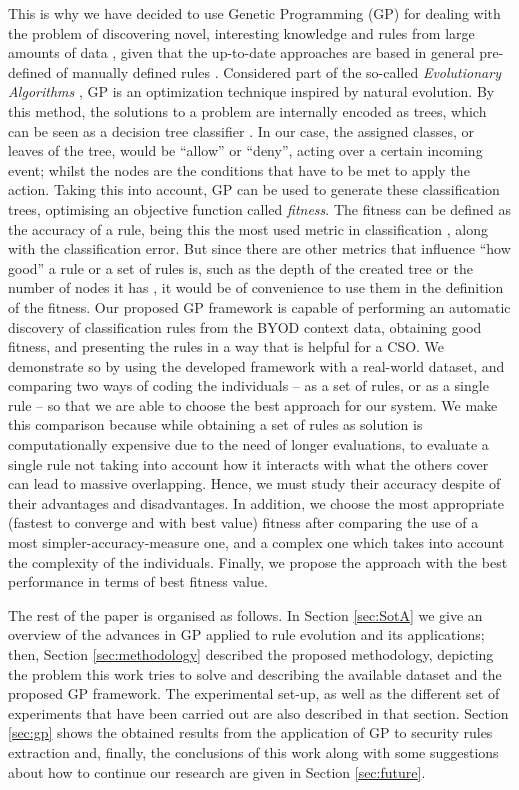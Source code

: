 \documentclass[a4paper,10pt,twocolumn,preprint,3p]{elsarticle}
\begin{document}
This is why we have decided to use Genetic Programming (GP) for dealing with the problem of
discovering novel, interesting knowledge and rules from large
amounts of data \cite{freitas2002data}, given that the up-to-date approaches are based in general pre-defined of manually defined rules \cite{ali2015analysis}. Considered part of the so-called \emph{Evolutionary
  Algorithms} \cite{back1996evolutionary}, GP is an optimization
technique inspired by natural evolution. By this method, the
solutions to a problem are internally encoded as trees, which can be
seen as a decision tree classifier \cite{safavian1990survey}. In our
case, the assigned classes, or leaves of the tree, would be ``allow''
or ``deny'', acting over a certain incoming event; whilst the nodes
are the conditions that have to be met to apply the action. Taking
this into account, GP can be used to generate these classification
trees, optimising an objective function called {\em fitness}. The
fitness can be defined as the accuracy of a rule, being this the most
used metric in classification \cite{witten2005data}, along with the
classification error. But since there are other metrics that influence
``how good'' a rule or a set of rules is, such as the depth of the
created tree or the number of nodes it has
\cite{back1996evolutionary}, it would be of convenience to use them in
the definition of the fitness. 
Our proposed GP framework is capable of performing an automatic discovery
of classification rules from the BYOD context data, obtaining good fitness, and presenting the
rules in a way that is helpful for a CSO. We demonstrate so by using
the developed framework with a real-world dataset, and comparing two
ways of coding the individuals -- as a set of rules, or as a single
rule -- so that we are able to choose the best approach for our system. We make this comparison because while obtaining a set of rules as solution is computationally expensive due to the need of longer evaluations, to evaluate a single rule not taking into account how it interacts with what the others cover \cite{freitas2002data} can lead to massive overlapping. Hence, we must study their accuracy despite of their advantages and disadvantages. In addition, we choose the most appropriate (fastest to converge and with best value) fitness after comparing the use of a most simpler-accuracy-measure one, and a complex one which takes into account the complexity of the individuals. Finally, we propose the approach with the best performance in terms of best fitness value. 

The rest of the paper is organised as follows. In Section
\ref{sec:SotA} we give an overview of the advances in GP applied to
rule evolution and its applications; then, Section
\ref{sec:methodology} described the proposed methodology, depicting
the problem this work tries to solve and describing the available
dataset and the proposed GP framework. The experimental set-up, as
well as the different set of experiments that have been carried out
are also described in that section. Section \ref{sec:gp} shows the
obtained results from the application of GP to security rules
extraction and, finally, the conclusions of this work along with some
suggestions about how to continue our research are given in Section
\ref{sec:future}.   
\end{document}
